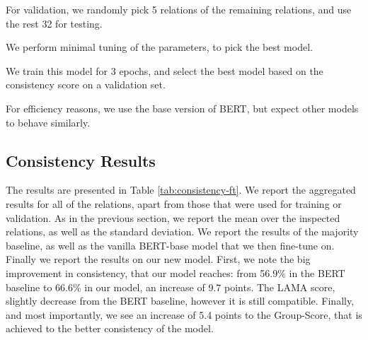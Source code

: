 For validation, we randomly pick 5 relations of the remaining relations, and use the rest 32 for testing.

We perform minimal tuning of the parameters, to pick the best model.

We train this model for 3 epochs, and select the best model based on the consistency score on a validation set.

For efficiency reasons, we use the base version of BERT, but expect other models to behave similarly.


\subsection{Consistency Results}



The results are presented in Table \ref{tab:consistency-ft}. We report the aggregated results for all of the relations, apart from those that were used for training or validation. As in the previous section, we report the mean over the inspected relations, as well as the standard deviation.
We report the results of the majority baseline, as well as the vanilla BERT-base model that we then fine-tune on. Finally we report the results on our new model.
First, we note the big improvement in consistency, that our model reaches: from 56.9\% in the BERT baseline to 66.6\% in our model, an increase of 9.7 points. 
The LAMA score, slightly decrease from the BERT baseline, however it is still compatible. Finally, and most importantly, we see an increase of 5.4 points to the Group-Score, that is achieved to the better consistency of the model.





